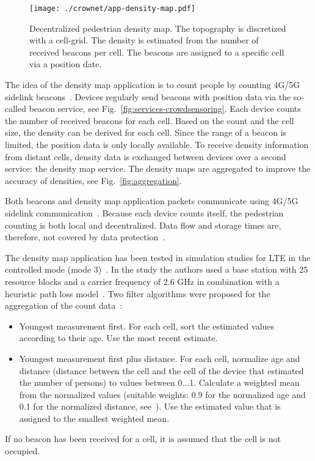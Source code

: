 \begin{figure}[hbt!]
\centering
\texttt{[image: ./crownet/app-density-map.pdf]} 
\caption[Decentralized pedestrian density map]{Decentralized pedestrian density map. The topography is discretized with a cell-grid. The  density is estimated from the number of received beacons per cell. The beacons are assigned to a specific cell via a position date.
}
\label{fig:densitymap565242}
\end{figure}

The idea of the density map application is to count people by counting 4G/5G sidelink beacons~\cite{schuhbaeck-2021-com}.  
Devices regularly send beacons with position data via the so-called beacon service, see Fig.~\ref{fig:services-crowdsensoring}. 
Each device counts the number of received beacons for each cell. Based on the count and the cell size, the  density can be derived for each cell. 
Since the range of a beacon is limited, the position data is only locally available.
To receive density information from distant cells, density data is exchanged between devices over a second service: the density map service.  The density maps are aggregated to improve the accuracy of densities, see Fig.~\ref{fig:aggregation}.


Both beacons and density map application packets communicate using 4G/5G sidelink communication~\cite{schuhbaeck-2023-com}. Because each device counts itself, the pedestrian counting is both local and decentralized. Data flow and storage times are, therefore, not covered by data protection~\cite{moencke-2023-com}. 

The density map application has been tested in simulation studies for LTE in the controlled mode (mode 3)~\cite{schuhbaeck-2023-com}. In the study the authors used a base station with 25 resource blocks and a carrier frequency of 2.6 GHz in combination with a heuristic path loss model~\cite{itu-2012-com}. Two filter algorithms were proposed for the aggregation of the count data~\cite{schuhbaeck-2023-com}:

\begin{itemize}
\item Youngest measurement first. For each cell, sort the estimated values according to their age. Use the most recent estimate.
\item Youngest measurement first plus distance. For each cell, normalize age and distance (distance between the cell and the cell of the device that estimated the number of persons) to values between 0...1. Calculate a weighted mean from the normalized values (suitable weights: 0.9 for the normalized age and 0.1 for the normalized distance, see~\cite{schuhbaeck-2023-com}). Use the estimated value that is assigned to the smallest weighted mean.
\end{itemize}
If no beacon has been received for a cell, it is assumed that the cell is not occupied.


